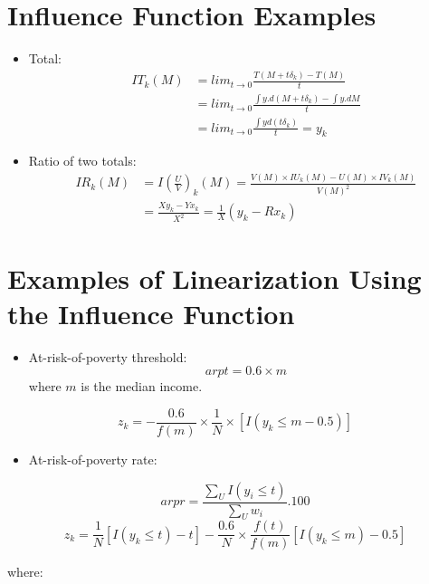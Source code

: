 \documentclass[
]{book}
\providecommand{\tightlist}{%
  \setlength{\itemsep}{0pt}\setlength{\parskip}{0pt}}
\begin{document}
\hypertarget{influence-function-examples}{%
\section{Influence Function Examples}\label{influence-function-examples}}

\begin{itemize}
\item
  Total:
  \[
  \begin{aligned}
  IT_k(M)&=lim_{t\rightarrow 0}\frac{T(M+t\delta_k)-T(M)}{t}\\
  &=lim_{t\rightarrow 0}\frac{\int y.d(M+t\delta_k)-\int y.dM}{t}\\
  &=lim_{t\rightarrow 0}\frac{\int yd(t\delta_k)}{t}=y_k  
  \end{aligned}
  \]
\item
  Ratio of two totals:
  \[
  \begin{aligned}
  IR_k(M)&=I\left(\frac{U}{V}\right)_k(M)=\frac{V(M)\times IU_k(M)-U(M)\times IV_k(M)}{V(M)^2}\\
  &=\frac{X y_k-Y x_k}{X^2}=\frac{1}{X}(y_k-Rx_k)
  \end{aligned}
  \]
\end{itemize}

\hypertarget{examples-of-linearization-using-the-influence-function}{%
\section{Examples of Linearization Using the Influence Function}\label{examples-of-linearization-using-the-influence-function}}

\begin{itemize}
\tightlist
\item
  At-risk-of-poverty threshold:
  \[
  arpt = 0.6\times m
  \]
  where \(m\) is the median income.
\end{itemize}

\[
z_k= -\frac{0.6}{f(m)}\times\frac{1}{N}\times\left[I(y_k\leq m-0.5) \right]
\]

\begin{itemize}
\tightlist
\item
  At-risk-of-poverty rate:
\end{itemize}

\[
arpr=\frac{\sum_U I(y_i \leq t)}{\sum_U w_i}.100
\]
\[
z_k=\frac{1}{N}\left[I(y_k\leq t)-t\right]-\frac{0.6}{N}\times\frac{f(t)}{f(m)}\left[I(y_k\leq m)-0.5\right]
\]

where:
\end{document}
